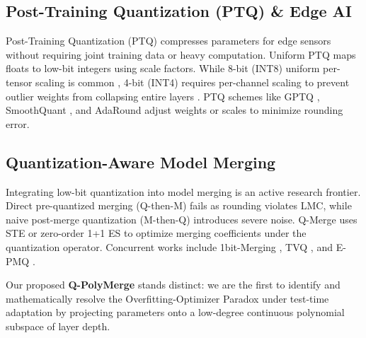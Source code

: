 \subsection{Post-Training Quantization (PTQ) \& Edge AI}
Post-Training Quantization (PTQ) compresses parameters for edge sensors \cite{gholami2021survey, jacob2018quantization} without requiring joint training data or heavy computation. Uniform PTQ maps floats to low-bit integers using scale factors. While 8-bit (INT8) uniform per-tensor scaling is common \cite{jacob2018quantization}, 4-bit (INT4) requires per-channel scaling to prevent outlier weights from collapsing entire layers \cite{lin2023awq}. PTQ schemes like GPTQ \cite{frantar2022gptq}, SmoothQuant \cite{xiao2023smoothquant}, and AdaRound \cite{nagel2020adaround} adjust weights or scales to minimize rounding error.

\subsection{Quantization-Aware Model Merging}
Integrating low-bit quantization into model merging is an active research frontier. Direct pre-quantized merging (Q-then-M) fails as rounding violates LMC, while naive post-merge quantization (M-then-Q) introduces severe noise. Q-Merge uses STE \cite{bengio2013estimating} or zero-order 1+1 ES to optimize merging coefficients under the quantization operator. Concurrent works include 1bit-Merging \cite{onebitmerging2025}, TVQ \cite{tvq2025}, and E-PMQ \cite{epmq2026}. 

Our proposed \textbf{Q-PolyMerge} stands distinct: we are the first to identify and mathematically resolve the Overfitting-Optimizer Paradox under test-time adaptation by projecting parameters onto a low-degree continuous polynomial subspace of layer depth.
